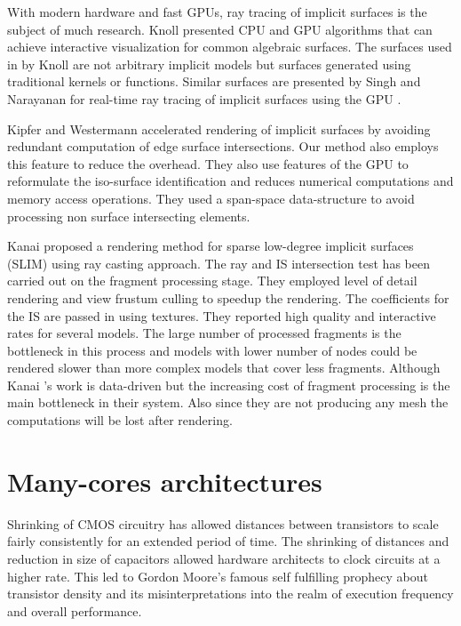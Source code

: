 With modern hardware and fast GPUs, ray tracing of implicit surfaces is the subject of much research. Knoll \etal \cite{Knoll2009} presented 
CPU and GPU algorithms that can achieve interactive visualization for common algebraic surfaces. The surfaces used in by Knoll \etal are not 
arbitrary implicit models but surfaces generated using traditional kernels or functions. Similar surfaces are presented by Singh and Narayanan
for real-time ray tracing of implicit surfaces using the GPU \cite{singh2010real}. 


Kipfer and Westermann \cite{Kipfer2005} accelerated rendering of implicit surfaces by avoiding redundant computation of edge surface intersections. 
Our method also employs this feature to reduce the overhead. They also use features of the GPU to reformulate the iso-surface identification and reduces 
numerical computations and memory access operations. They used a span-space data-structure to avoid processing non surface intersecting elements.

Kanai \etal \cite{Kanai2006a} proposed a rendering method for sparse low-degree implicit surfaces (SLIM) using ray casting approach. The ray and IS intersection
test has been carried out on the fragment processing stage. They employed level of detail rendering and view frustum culling to speedup the rendering. 
The coefficients for the IS are passed in using textures. They reported high quality and interactive rates for several models. The large number of processed
fragments is the bottleneck in this process and models with lower number of nodes could be rendered slower than more complex models that cover less fragments.
Although Kanai \etal's work is data-driven but the increasing cost of fragment processing is the main bottleneck in their system. Also since they are not
producing any mesh the computations will be lost after rendering.



\section{Many-cores architectures}
Shrinking of CMOS circuitry has allowed distances between transistors to scale fairly consistently for an extended period of time. The shrinking 
of distances and reduction in size of capacitors allowed hardware architects to clock circuits at a higher rate. This led to Gordon Moore's
famous self fulfilling prophecy about transistor density and its misinterpretations into the realm of execution frequency and overall performance.

